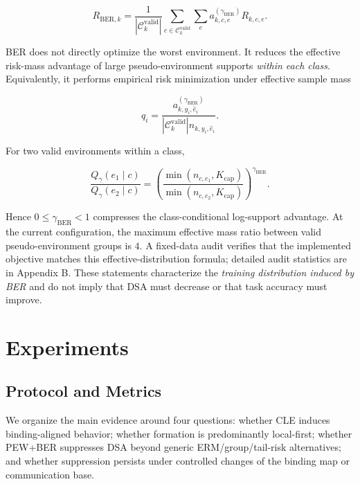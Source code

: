 \documentclass[10pt,twocolumn]{article}
\begin{document}
\[
R_{\mathrm{BER},k}
=
\frac1{|\mathcal C_k^{\mathrm{valid}}|}
\sum_{c\in\mathcal C_k^{\mathrm{valid}}}
\sum_e a^{(\gamma_{\mathrm{BER}})}_{k,c,e}R_{k,c,e}.
\]

BER does not directly optimize the worst environment. It reduces the effective risk-mass advantage of large pseudo-environment supports \emph{within each class}. Equivalently, it performs empirical risk minimization under effective sample mass

\[
q_i=
\frac{a^{(\gamma_{\mathrm{BER}})}_{k,y_i,\hat e_i}}
{|\mathcal C_k^{\mathrm{valid}}|n_{k,y_i,\hat e_i}}.
\]

For two valid environments within a class,

\[
\frac{Q_\gamma(e_1\mid c)}{Q_\gamma(e_2\mid c)}
=
\left(
\frac{\min(n_{c,e_1},K_{\mathrm{cap}})}
{\min(n_{c,e_2},K_{\mathrm{cap}})}
\right)^{\gamma_{\mathrm{BER}}}.
\]

Hence \(0\le\gamma_{\mathrm{BER}}<1\) compresses the class-conditional log-support advantage. At the current configuration, the maximum effective mass ratio between valid pseudo-environment groups is \(4\). A fixed-data audit verifies that the implemented objective matches this effective-distribution formula; detailed audit statistics are in Appendix B. These statements characterize the \emph{training distribution induced by BER} and do not imply that DSA must decrease or that task accuracy must improve.

\section{Experiments}

\subsection{Protocol and Metrics}

We organize the main evidence around four questions: whether CLE induces binding-aligned behavior; whether formation is predominantly local-first; whether PEW+BER suppresses DSA beyond generic ERM/group/tail-risk alternatives; and whether suppression persists under controlled changes of the binding map or communication base.
\end{document}
